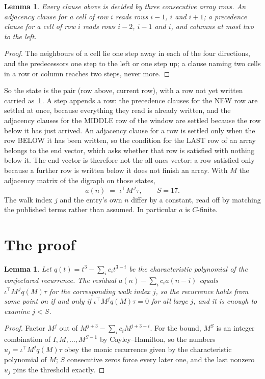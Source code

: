 \documentclass[11pt,a4paper]{article}
\theoremstyle{plain}
\newtheorem{lemma}[theorem]{Lemma}
\theoremstyle{definition}
\begin{document}
\begin{lemma}\label{lem:win}
Every clause above is decided by three consecutive array rows. An adjacency clause for a cell
of row $i$ reads rows $i-1$, $i$ and $i+1$; a precedence clause for a cell of row $i$ reads
rows $i-2$, $i-1$ and $i$, and columns at most two to the left.
\end{lemma}

\begin{proof}
The neighbours of a cell lie one step away in each of the four directions, and the predecessors
one step to the left or one step up; a clause naming two cells in a row or column reaches two
steps, never more.
\end{proof}

So the state is the pair (row above, current row), with a row not yet written carried as
$\bot$. A step appends a row: the precedence clauses for the NEW row are settled at once,
because everything they read is already written, and the adjacency clauses for the MIDDLE row
of the window are settled because the row below it has just arrived. An adjacency clause for a row is settled only when the row BELOW it has been
written, so the condition for the LAST row of an array belongs to the end vector, which asks
whether that row is satisfied with nothing below it. The end vector is therefore not the
all-ones vector: a row satisfied only because a further row is written below it does not
finish an array. With $M$ the
adjacency matrix of the digraph on those states,
\[
a(n)\;=\;\iota^{\!\top}M^{\,j}\tau ,\qquad S=17.
\]
The walk index $j$ and the entry's own $n$ differ by a constant, read off by matching the
published terms rather than assumed. In particular $a$ is $C$-finite.

\section{The proof}

\begin{lemma}\label{lem:crit}
Let $q(t)=t^{3}-\sum_i c_it^{3-i}$ be the characteristic polynomial of the
conjectured recurrence. The residual $a(n)-\sum_ic_ia(n-i)$ equals
$\iota^{\!\top}M^{\,j}q(M)\tau$ for the corresponding walk index $j$, so the recurrence
holds from some point on if and only if $\iota^{\!\top}M^{j}q(M)\tau=0$ for all large $j$,
and it is enough to examine $j<S$.
\end{lemma}

\begin{proof}
Factor $M^{j}$ out of $M^{j+3}-\sum_ic_iM^{j+3-i}$. For the bound, $M^{S}$
is an integer combination of $I,M,\dots,M^{S-1}$ by Cayley--Hamilton, so the numbers
$u_j=\iota^{\!\top}M^{j}q(M)\tau$ obey the monic recurrence given by the characteristic
polynomial of $M$; $S$ consecutive zeros force every later one, and the last nonzero $u_j$
pins the threshold exactly.
\end{proof}
\end{document}
